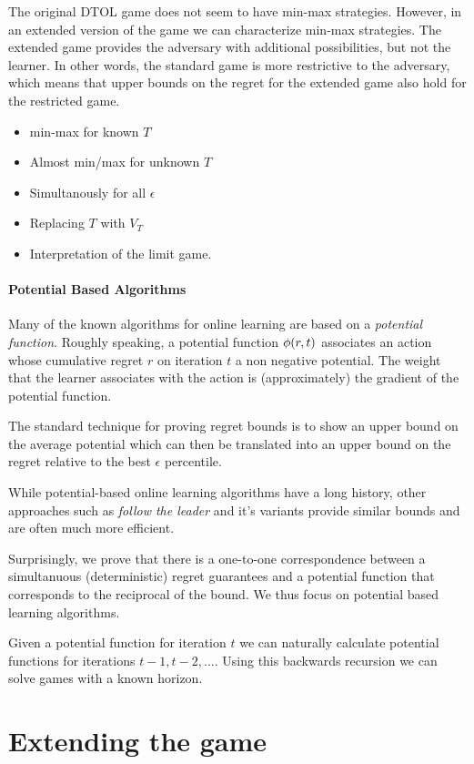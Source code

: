 \documentclass[12pt]{article} %
\begin{document}
The original DTOL game does not seem to have min-max
strategies. However, in an extended version of the game we can
characterize min-max strategies. The extended game provides the
adversary with additional possibilities, but not the learner. In other
words, the standard game is more restrictive to the adversary, which
means that upper bounds on the regret for the extended game also hold
for the restricted game.

\begin{itemize}
\item min-max for known $T$
\item Almost min/max for unknown $T$
\item Simultanously for all $\epsilon$
\item Replacing $T$ with $V_T$
\item Interpretation of the limit game.
\end{itemize}

\paragraph*{Potential Based Algorithms}
Many of the known algorithms for online learning are based on a {\em
  potential function}. Roughly speaking, a potential function
$\phi(r,t)$ associates an action whose cumulative regret $r$ on iteration
$t$ a non negative potential. The weight that the learner associates
with the action is (approximately) the gradient of the potential
function.

The standard technique for proving regret bounds is to show an upper
bound on the average potential which can then be translated into an
upper bound on the regret relative to the best $\epsilon$ percentile.

While potential-based online learning algorithms have a long history,
other approaches such as {\em follow the leader} and it's variants
provide similar bounds and are often much more efficient.

Surprisingly, we prove that there is a one-to-one correspondence
between a simultanuous (deterministic) regret guarantees and a
potential function that corresponds to the reciprocal of the bound. We
thus focus on potential based learning algorithms.

Given a potential function for iteration $t$ we can naturally
calculate potential functions for iterations $t-1,t-2,\ldots$. Using
this backwards recursion we can solve games with a known
horizon. 


\section{Extending the game}
\end{document}
